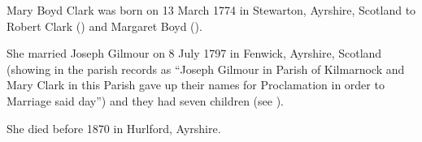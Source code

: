 
Mary Boyd Clark was born on 13 March 1774 in Stewarton, Ayrshire, Scotland to Robert Clark () and Margaret Boyd ().

She married Joseph Gilmour on 8 July 1797 in Fenwick, Ayrshire, Scotland \cite{MBClarkMarriage} (showing in the parish records as ``Joseph Gilmour in Parish of Kilmarnock and Mary Clark in this Parish gave up their names for Proclamation in order to Marriage said day'') and they had seven children (see ).

She died before 1870 in Hurlford, Ayrshire.\cite{JosephGilmourDeath}

